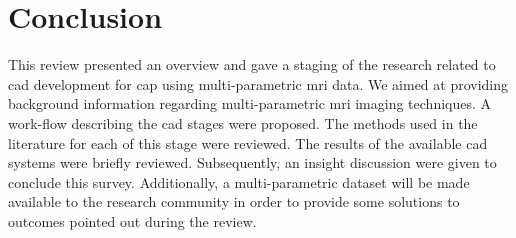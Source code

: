 \section{Conclusion} \label{sec:conclusion}

This review presented an overview and gave a staging of the research related to \ac{cad} development for \ac{cap} using multi-parametric \ac{mri} data. We aimed at providing background information regarding multi-parametric \ac{mri} imaging techniques. A work-flow describing the \ac{cad} stages were proposed. The methods used in the literature for each of this stage were reviewed. The results of the available \ac{cad} systems were briefly reviewed. Subsequently, an insight discussion were given to conclude this survey. Additionally, a multi-parametric dataset will be made available to the research community in order to provide some solutions to outcomes pointed out during the review.

